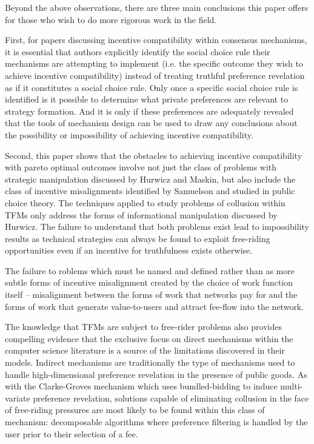 \documentclass[oneside]{article}   	%
\begin{document}
Beyond the above observations, there are three main conclusions this paper offers for those who wish to do more rigorous work in the field.

First, for papers discussing incentive compatibility within consensus mechanisms, it is essential that authors explicitly identify the social choice rule their mechanisms are attempting to implement (i.e. the specific outcome they wish to achieve incentive compatibility) instead of treating truthful preference revelation as if it constitutes a social choice rule. Only once a specific social choice rule is identified is it possible to determine what private preferences are relevant to strategy formation. And it is only if these preferences are adequately revealed that the tools of mechanism design can be used to draw any conclusions about the possibility or impossibility of achieving incentive compatibility.

Second, this paper shows that the obstacles to achieving incentive compatibility with pareto optimal outcomes involve not just the class of problems with strategic manipulation discussed by Hurwicz and Maskin, but also include the class of incentive misalignments identified by Samuelson and studied in public choice theory. The techniques applied to study problems of collusion within TFMs only address the forms of informational manipulation discussed by Hurwicz. The failure to understand that both problems exist lead to impossibility results as technical strategies can always be found to exploit free-riding opportunities even if an incentive for truthfulness exists otherwise.







The failure to roblems which must be named and defined rather than as more subtle forms of incentive misalignment created by the choice of work function itself -- misalignment between the forms of work that networks pay for and the forms of work that generate value-to-users and attract fee-flow into the network.

The knowledge that TFMs are subject to free-rider problems also provides compelling evidence that the exclusive focus on direct mechanisms within the computer science literature is a source of the limitations discovered in their models. Indirect mechanisms are traditionally the type of mechanisms used to handle high-dimensional preference revelation in the presence of public goods. As with the Clarke-Groves mechanism which uses bundled-bidding to induce multi-variate preference revelation, solutions capable of eliminating collusion in the face of free-riding pressures are most likely to be found within this class of mechanism: decomposable algorithms where preference filtering is handled by the user prior to their selection of a fee.
\end{document}
